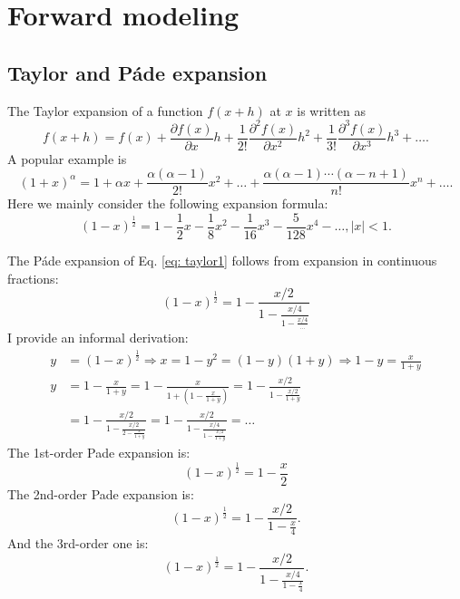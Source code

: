 
\section{Forward modeling}

\subsection{Taylor and P\'{a}de expansion}

The Taylor expansion of a function $f(x+h)$ at $x$ is written as
\begin{equation}
f(x+h)=f(x)+\frac{\partial f(x)}{\partial x}h+\frac{1}{2!}\frac{\partial^2 f(x)}{\partial x^2}h^2+\frac{1}{3!}\frac{\partial^3 f(x)}{\partial x^3}h^3+\ldots.
\end{equation}
A popular example is
\begin{equation}
(1+x)^{\alpha}=1+\alpha x+\frac{\alpha(\alpha-1)}{2!}x^2+\ldots+\frac{\alpha(\alpha-1)\cdots(\alpha-n+1)}{n!}x^n+\ldots.
\end{equation}
Here we mainly consider the following expansion formula:
\begin{equation}\label{eq: taylor1}
(1-x)^{\frac{1}{2}}=1-\frac{1}{2}x-\frac{1}{8}x^2-\frac{1}{16}x^3-\frac{5}{128}x^4-\ldots, |x|<1.
\end{equation}

The P\'{a}de expansion of Eq. \eqref{eq: taylor1} follows from expansion in continuous fractions:
\begin{equation}
(1-x)^{\frac{1}{2}}=1-\frac{x/2}{1-\frac{x/4}{1-\frac{x/4}{\ldots}}}
\end{equation}
I provide an informal derivation:
\begin{displaymath}
\begin{split}
y&=(1-x)^{\frac{1}{2}}\Rightarrow x=1-y^2=(1-y)(1+y)\Rightarrow 1-y=\frac{x}{1+y}\\
y&=1-\frac{x}{1+y}=1-\frac{x}{1+(1-\frac{x}{1+y})}=1-\frac{x/2}{1-\frac{x/2}{1+y}}\\
&=1-\frac{x/2}{1-\frac{x/2}{2-\frac{x}{1+y}}}
=1-\frac{x/2}{1-\frac{x/4}{1-\frac{x/2}{1+y}}}=\ldots
\end{split}
\end{displaymath}
The 1st-order Pade expansion is:
\begin{equation}
(1-x)^{\frac{1}{2}}=1-\frac{x}{2}
\end{equation}
The 2nd-order Pade expansion is:
\begin{equation}
(1-x)^{\frac{1}{2}}=1-\frac{x/2}{1-\frac{x}{4}}.
\end{equation}
And the 3rd-order one is:
\begin{equation}
(1-x)^{\frac{1}{2}}=1-\frac{x/2}{1-\frac{x/4}{1-\frac{x}{4}}}.
\end{equation}

